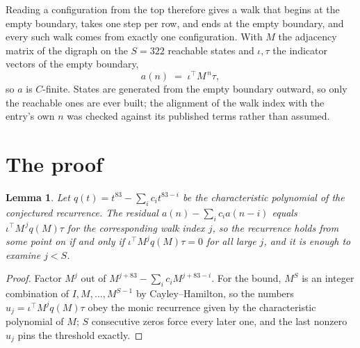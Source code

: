 \documentclass[11pt,a4paper]{article}
\theoremstyle{plain}
\newtheorem{lemma}[theorem]{Lemma}
\theoremstyle{definition}
\begin{document}
Reading a configuration from the top therefore gives a walk that begins at the empty boundary,
takes one step per row, and ends at the empty boundary, and every such walk comes from exactly
one configuration. With $M$ the adjacency matrix of the digraph on the $S=322$ reachable
states and $\iota,\tau$ the indicator vectors of the empty boundary,
\[
a(n)\;=\;\iota^{\!\top}M^{\,n}\tau ,
\]
so $a$ is $C$-finite. States are generated from the empty boundary outward, so only the
reachable ones are ever built; the alignment of the walk index with the entry's own $n$ was
checked against its published terms rather than assumed.

\section{The proof}

\begin{lemma}\label{lem:crit}
Let $q(t)=t^{83}-\sum_i c_it^{83-i}$ be the characteristic polynomial of the
conjectured recurrence. The residual $a(n)-\sum_ic_ia(n-i)$ equals
$\iota^{\!\top}M^{\,j}q(M)\tau$ for the corresponding walk index $j$, so the recurrence
holds from some point on if and only if $\iota^{\!\top}M^{j}q(M)\tau=0$ for all large $j$,
and it is enough to examine $j<S$.
\end{lemma}

\begin{proof}
Factor $M^{j}$ out of $M^{j+83}-\sum_ic_iM^{j+83-i}$. For the bound, $M^{S}$
is an integer combination of $I,M,\dots,M^{S-1}$ by Cayley--Hamilton, so the numbers
$u_j=\iota^{\!\top}M^{j}q(M)\tau$ obey the monic recurrence given by the characteristic
polynomial of $M$; $S$ consecutive zeros force every later one, and the last nonzero $u_j$
pins the threshold exactly.
\end{proof}
\end{document}
